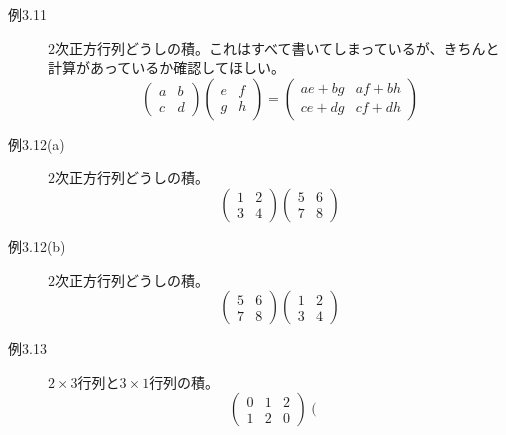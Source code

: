 \documentclass[10pt]{jsarticle}
\theoremstyle{definition}%
\numberwithin{equation}{section}%
\begin{document}
\begin{description}
  \item[例3.11] $2$次正方行列どうしの積。これはすべて書いてしまっているが、きちんと計算があっているか確認してほしい。\begin{equation}
    \left( 
     \begin{matrix}
         a & b \\
         c & d
     \end{matrix}
   \right)\left( 
    \begin{matrix}
        e & f \\
        g & h
    \end{matrix}
  \right)=\left( 
    \begin{matrix}
        ae+bg & af+bh \\
        ce+dg & cf+dh
    \end{matrix}
  \right)
  \end{equation}
  \item[例3.12(a)] $2$次正方行列どうしの積。
  \begin{equation}
    \left( 
     \begin{matrix}
         1 & 2 \\
         3 & 4
     \end{matrix}
   \right)\left( 
    \begin{matrix}
        5 & 6 \\
        7 & 8
    \end{matrix}
  \right)
  \end{equation}
  \item[例3.12(b)] $2$次正方行列どうしの積。
  \begin{equation}
    \left( 
    \begin{matrix}
        5 & 6 \\
        7 & 8
    \end{matrix}
  \right)\left( 
    \begin{matrix}
        1 & 2 \\
        3 & 4
    \end{matrix}
  \right)
  \end{equation}
  \item[例3.13] $2\times 3$行列と$3\times 1$行列の積。
  \begin{equation}
    \left( 
     \begin{matrix}
         0 & 1 & 2\\
         1 & 2 & 0
     \end{matrix}
   \right)\left( 
    \begin{matrix}

\end{matrix}
\end{equation}
\end{description}
\end{document}
